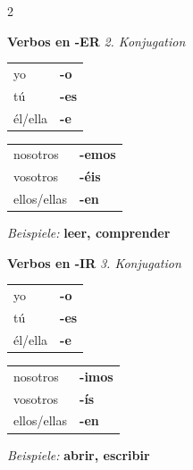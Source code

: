 \documentclass[10pt, a4paper]{article}
\newcommand{\es}[1]{\textbf{#1}}
\newcommand{\de}[1]{{\small\textit{\textcolor{mittelgrau}{#1}}}}
\newcommand{\ender}[1]{\textcolor{endungER}{\textbf{#1}}}
\newcommand{\endir}[1]{\textcolor{endungIR}{\textbf{#1}}}
\begin{document}
\begin{grammatikbox}
\begin{multicols}{2}

{\large\bfseries Verbos en \ender{-ER}} \de{2. Konjugation}

\vspace{3pt}

{\small
\begin{tabular}{@{}ll@{}}
yo & \ender{-o} \\
tú & \ender{-es} \\
él/ella & \ender{-e} \\
\end{tabular}
\hfill
\begin{tabular}{@{}ll@{}}
nosotros & \ender{-emos} \\
vosotros & \ender{-éis} \\
ellos/ellas & \ender{-en} \\
\end{tabular}}

\vspace{4pt}

{\footnotesize\textit{Beispiele:} \es{leer, comprender}}

\columnbreak

{\large\bfseries Verbos en \endir{-IR}} \de{3. Konjugation}

\vspace{3pt}

{\small
\begin{tabular}{@{}ll@{}}
yo & \endir{-o} \\
tú & \endir{-es} \\
él/ella & \endir{-e} \\
\end{tabular}
\hfill
\begin{tabular}{@{}ll@{}}
nosotros & \endir{-imos} \\
vosotros & \endir{-ís} \\
ellos/ellas & \endir{-en} \\
\end{tabular}}

\vspace{4pt}

{\footnotesize\textit{Beispiele:} \es{abrir, escribir}}

\end{multicols}
\end{grammatikbox}

\vspace{2pt}
\end{document}
